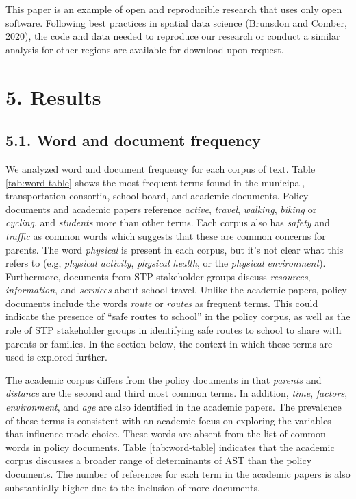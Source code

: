 \documentclass[]{elsarticle} %
\begin{document}
This paper is an example of open and reproducible research that uses
only open software. Following best practices in spatial data science
(Brunsdon and Comber, 2020), the code and data needed to reproduce our
research or conduct a similar analysis for other regions are available
for download upon request.

\hypertarget{results}{%
\section{5. Results}\label{results}}

\hypertarget{word-and-document-frequency}{%
\subsection{5.1. Word and document
frequency}\label{word-and-document-frequency}}

We analyzed word and document frequency for each corpus of text. Table
\ref{tab:word-table} shows the most frequent terms found in the
municipal, transportation consortia, school board, and academic
documents. Policy documents and academic papers reference \emph{active},
\emph{travel}, \emph{walking}, \emph{biking} or \emph{cycling}, and
\emph{students} more than other terms. Each corpus also has
\emph{safety} and \emph{traffic} as common words which suggests that
these are common concerns for parents. The word \emph{physical} is
present in each corpus, but it's not clear what this refers to (e.g,
\emph{physical activity}, \emph{physical health}, or the \emph{physical
environment}). Furthermore, documents from STP stakeholder groups
discuss \emph{resources}, \emph{information}, and \emph{services} about
school travel. Unlike the academic papers, policy documents include the
words \emph{route} or \emph{routes} as frequent terms. This could
indicate the presence of ``safe routes to school'' in the policy corpus,
as well as the role of STP stakeholder groups in identifying safe routes
to school to share with parents or families. In the section below, the
context in which these terms are used is explored further.

The academic corpus differs from the policy documents in that
\emph{parents} and \emph{distance} are the second and third most common
terms. In addition, \emph{time}, \emph{factors}, \emph{environment}, and
\emph{age} are also identified in the academic papers. The prevalence of
these terms is consistent with an academic focus on exploring the
variables that influence mode choice. These words are absent from the
list of common words in policy documents. Table \ref{tab:word-table}
indicates that the academic corpus discusses a broader range of
determinants of AST than the policy documents. The number of references
for each term in the academic papers is also substantially higher due to
the inclusion of more documents.
\end{document}
